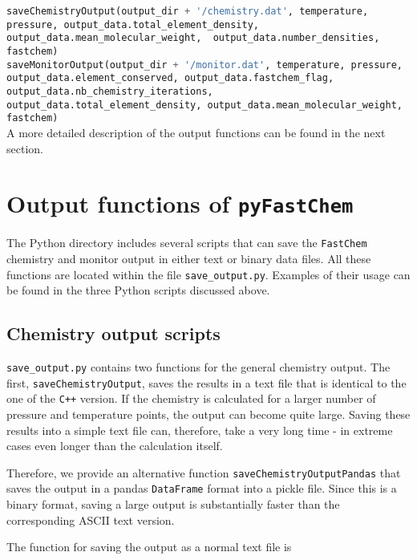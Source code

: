 \documentclass[numbers=noenddot]{aux/fcmanual}
\newcommand{\fc}{\texttt{FastChem}\xspace}
\newcommand{\pfc}{\texttt{pyFastChem}\xspace}
\newcommand{\cpp}{\ttt{C++}\xspace}
\newcommand{\ttt}[1]{\texttt {#1}}
\begin{document}
\lstinline[language=Python, breaklines, breakatwhitespace]!saveChemistryOutput(output_dir + '/chemistry.dat', temperature, pressure, output_data.total_element_density, output_data.mean_molecular_weight,  output_data.number_densities, fastchem)!\\

\lstinline[language=Python, breaklines, breakatwhitespace]!saveMonitorOutput(output_dir + '/monitor.dat', temperature, pressure, output_data.element_conserved, output_data.fastchem_flag, output_data.nb_chemistry_iterations, output_data.total_element_density, output_data.mean_molecular_weight, fastchem)!\\

A more detailed description of the output functions can be found in the next section.


\section{Output functions of \pfc}

The Python directory includes several scripts that can save the \fc chemistry and monitor output in either text or binary data files. All these functions are located within the file \texttt{save\_output.py}. Examples of their usage can be found in the three Python scripts discussed above. \\

\subsection{Chemistry output scripts}

\texttt{save\_output.py} contains two functions for the general chemistry output. The first, \lstinline[language=Python]!saveChemistryOutput!, saves the results in a text file that is identical to the one of the \cpp version. If the chemistry is calculated for a larger number of pressure and temperature points, the output can become quite large. Saving these results into a simple text file can, therefore, take a very long time - in extreme cases even longer than the calculation itself.

Therefore, we provide an alternative function \lstinline[language=Python]!saveChemistryOutputPandas! that saves the output in a pandas \lstinline[language=Python]!DataFrame! format into a pickle file. Since this is a binary format, saving a large output is substantially faster than the corresponding ASCII text version.

The function for saving the output as a normal text file is\\
\end{document}
